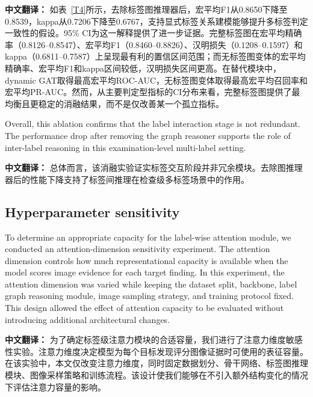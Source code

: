 \documentclass[Afour,sagev,times]{sagej}
\begin{document}
\textbf{中文翻译：} 如表~\ref{T4}所示，去除标签图推理器后，宏平均F1从0.8650下降至0.8539，kappa从0.7206下降至0.6767，支持显式标签关系建模能够提升多标签判定一致性的假设。95\% CI为这一解释提供了进一步证据。完整标签图在宏平均精确率（0.8126--0.8547）、宏平均F1（0.8460--0.8826）、汉明损失（0.1208--0.1597）和kappa（0.6811--0.7587）上呈现最有利的置信区间范围；而无标签图变体的宏平均精确率、宏平均F1和kappa区间较低，汉明损失区间更高。在替代模块中，dynamic GAT取得最高宏平均ROC-AUC，无标签图变体取得最高宏平均召回率和宏平均PR-AUC。然而，从主要判定型指标的CI分布来看，完整标签图提供了最均衡且更稳定的消融结果，而不是仅改善某一个孤立指标。

Overall, this ablation confirms that the label interaction stage is not redundant. The performance drop after removing the graph reasoner supports the role of inter-label reasoning in this examination-level multi-label setting.

\textbf{中文翻译：} 总体而言，该消融实验证实标签交互阶段并非冗余模块。去除图推理器后的性能下降支持了标签间推理在检查级多标签场景中的作用。

\subsection{Hyperparameter sensitivity}
To determine an appropriate capacity for the label-wise attention module, we conducted an attention-dimension sensitivity experiment. The attention dimension controls how much representational capacity is available when the model scores image evidence for each target finding. In this experiment, the attention dimension was varied while keeping the dataset split, backbone, label graph reasoning module, image sampling strategy, and training protocol fixed. This design allowed the effect of attention capacity to be evaluated without introducing additional architectural changes.

\textbf{中文翻译：} 为了确定标签级注意力模块的合适容量，我们进行了注意力维度敏感性实验。注意力维度决定模型为每个目标发现评分图像证据时可使用的表征容量。在该实验中，本文仅改变注意力维度，同时固定数据划分、骨干网络、标签图推理模块、图像采样策略和训练流程。该设计使我们能够在不引入额外结构变化的情况下评估注意力容量的影响。
\end{document}
